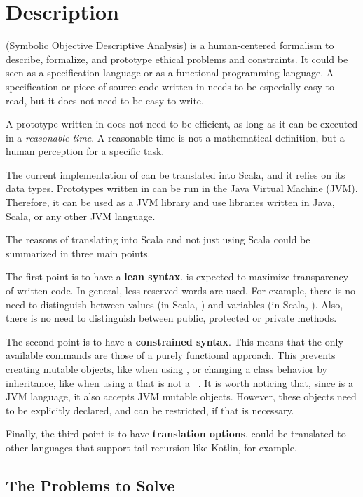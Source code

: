 \chapter{Description}

\Soda (Symbolic Objective Descriptive Analysis) is a human-centered formalism to describe, formalize, and prototype ethical problems and constraints.
It could be seen as a specification language or as a functional programming language.
A specification or piece of source code written in \Soda needs to be especially easy to read, but it does not need to be easy to write.

A prototype written in \Soda does not need to be efficient, as long as it can be executed in a \textit{reasonable time}.
A reasonable time is not a mathematical definition, but a human perception for a specific task.

The current implementation of \Soda can be translated into Scala, and it relies on its data types.
Prototypes written in \Soda can be run in the Java Virtual Machine (JVM).
Therefore, it can be used as a JVM library and use libraries written in Java, Scala, or any other JVM language.

The reasons of translating \Soda into Scala and not just using Scala could be summarized in three main points.

The first point is to have a \textbf{lean syntax}.
\Soda is expected to maximize transparency of written code.
In general, less reserved words are used.
For example, there is no need to distinguish between values (in Scala, \scalaval) and variables (in Scala, \scalavar).
Also, there is no need to distinguish between public, protected or private methods.

The second point is to have a \textbf{constrained syntax}.
This means that the only available commands are those of a purely functional approach.
This prevents creating mutable objects, like when using \scalavar, or changing a class behavior by inheritance, like when using a \scalaclass that is not a \scalacase \ \scalaclass.
It is worth noticing that, since \Soda is a JVM language, it also accepts JVM mutable objects.
However, these objects need to be explicitly declared, and can be restricted, if that is necessary.

Finally, the third point is to have \textbf{translation options}.
\Soda could be translated to other languages that support tail recursion like Kotlin, for example.


\section{The Problems to Solve}

